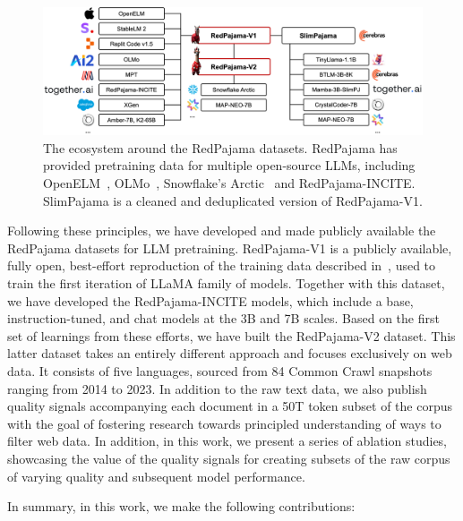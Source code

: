 \documentclass{article}
\begin{document}
\begin{figure}
    \centering
    \includegraphics[width=\textwidth]{figures/rp-ecosystem-v2.2.png}
    \caption{The ecosystem around the RedPajama datasets. RedPajama has provided pretraining data for multiple open-source LLMs, including OpenELM~\cite{mehta2024openelm}, OLMo~\cite{groeneveld2024olmo}, Snowflake's Arctic~\cite{SnowflakeArctic2023} and RedPajama-INCITE. SlimPajama is a cleaned and deduplicated version of RedPajama-V1.}
    \label{fig:rp-ecosystem}
\end{figure}

Following these principles, we have developed and made publicly available the RedPajama datasets for LLM pretraining.  
RedPajama-V1 is a publicly available, fully open, best-effort reproduction of the training data described in~\cite{touvron2023allama}, used to train the first iteration of LLaMA family of models. Together with this dataset, we have developed the RedPajama-INCITE models, which include a base, instruction-tuned, and chat models at the 3B and 7B scales. Based on the first set of learnings from these efforts, we have built the RedPajama-V2 dataset. This latter dataset takes an entirely different approach and focuses exclusively on web data. It consists of five languages, sourced from 84 Common Crawl snapshots ranging from 2014 to 2023. In addition to the raw text data, we also publish quality signals accompanying each document in a 50T token subset of the corpus with the goal of fostering research towards principled understanding of ways to filter web data. In addition, in this work, we present a series of ablation studies, showcasing the value of the quality signals for creating subsets of the raw corpus of varying quality and subsequent model performance. 

In summary, in this work, we make the following contributions:
\end{document}
